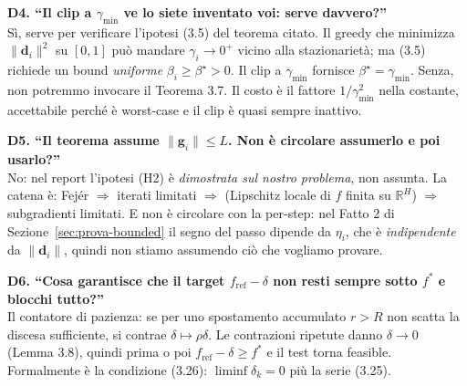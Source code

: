 \documentclass[11pt,a4paper]{article}
\theoremstyle{definition}
\newcommand{\g}{\bm{g}}
\newcommand{\dvec}{\bm{d}}
\newcommand{\fstar}{f^{*}}
\newcommand{\fref}{f_{\mathrm{ref}}}
\newcommand{\gmin}{\gamma_{\min}}
\newcommand{\norm}[1]{\lVert #1\rVert}
\newcommand{\R}{\mathbb{R}}
\begin{document}
\begin{oralbox}
\textbf{D4. ``Il clip a $\gmin$ ve lo siete inventato voi: serve davvero?''}\\
Sì, serve per verificare l'ipotesi (3.5) del teorema citato. Il greedy che minimizza
$\norm{\dvec_i}^2$ su $[0,1]$ può mandare $\gamma_i\to0^+$ vicino alla stazionarietà; ma (3.5)
richiede un bound \emph{uniforme} $\beta_i\ge\beta^\star>0$. Il clip a $\gmin$ fornisce
$\beta^\star=\gmin$. Senza, non potremmo invocare il Teorema 3.7. Il costo è il fattore
$1/\gmin^2$ nella costante, accettabile perché è worst-case e il clip è quasi sempre inattivo.
\end{oralbox}

\begin{oralbox}
\textbf{D5. ``Il teorema assume $\norm{\g_i}\le L$. Non è circolare assumerlo e poi usarlo?''}\\
No: nel report l'ipotesi (H2) è \emph{dimostrata sul nostro problema}, non assunta. La catena
è: Fej\'er $\Rightarrow$ iterati limitati $\Rightarrow$ (Lipschitz locale di $f$ finita su
$\R^H$) $\Rightarrow$ subgradienti limitati. E non è circolare con la per-step: nel Fatto 2 di
Sezione~\ref{sec:prova-bounded} il segno del passo dipende da $\eta_i$, che è \emph{indipendente}
da $\norm{\dvec_i}$, quindi non stiamo assumendo ciò che vogliamo provare.
\end{oralbox}

\begin{oralbox}
\textbf{D6. ``Cosa garantisce che il target $\fref-\delta$ non resti sempre sotto $\fstar$ e
blocchi tutto?''}\\
Il contatore di pazienza: se per uno spostamento accumulato $r>R$ non scatta la discesa
sufficiente, si contrae $\delta\mapsto\rho\delta$. Le contrazioni ripetute danno
$\delta\to0$ (Lemma 3.8), quindi prima o poi $\fref-\delta\ge\fstar$ e il test torna feasible.
Formalmente è la condizione (3.26): $\liminf\delta_k=0$ più la serie (3.25).
\end{oralbox}
\end{document}
